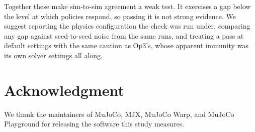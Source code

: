 \documentclass[conference]{IEEEtran}
\begin{document}
Together these make sim-to-sim agreement a weak test. It exercises a gap
below the level at which policies respond, so passing it is not strong
evidence. We suggest reporting the physics configuration the check was run
under, comparing any gap against seed-to-seed noise from the same runs,
and treating a pass at default settings with the same caution as Op3's,
whose apparent immunity was its own solver settings all along.

\section*{Acknowledgment}

We thank the maintainers of MuJoCo, MJX, MuJoCo Warp, and MuJoCo
Playground for releasing the software this study measures.



\end{document}
